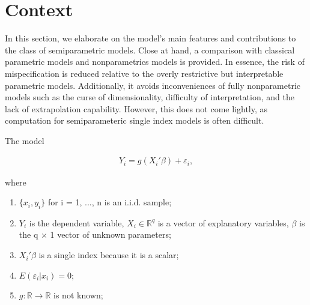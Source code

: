 \documentclass[a4paper]{article}
\begin{document}



\section{Context} %
\label{sec:context}
In this section, we elaborate on the model's main features and contributions to the class of semiparametric models. Close at hand, a comparison with classical parametric models and nonparametrics models is provided. In essence, the risk of mispecification is reduced relative to the overly restrictive but interpretable parametric models. Additionally, it avoids inconveniences of fully nonparametric models such as the curse of dimensionality, difficulty of interpretation, and the lack of extrapolation capability. However, this does not come lightly, as computation for semiparameteric single index models is often difficult.

\vspace{2mm} 
The model
 
\begin{eqnarray}
Y_i = g(X_i'\beta) + \varepsilon_i,
\end{eqnarray}

where

\begin{enumerate}[label=(\roman*)]
		\item $\{x_i,y_i\}$ for i = 1, ..., n is an i.i.d. sample;
		\item $Y_{i}$ is the dependent variable, $X_i \in \mathbb{R}^{q}$ is a vector of explanatory variables, $\beta$ is the q $\times$ 1 vector of unknown parameters; 
	\item $X_i'\beta$ is a single index because it is a scalar;
	\item $ E(\varepsilon_i|x_i) = 0 $;
	\item $g: \mathbb{R} \rightarrow \mathbb{R} $ is not known; 
\end{enumerate}
\end{document}
